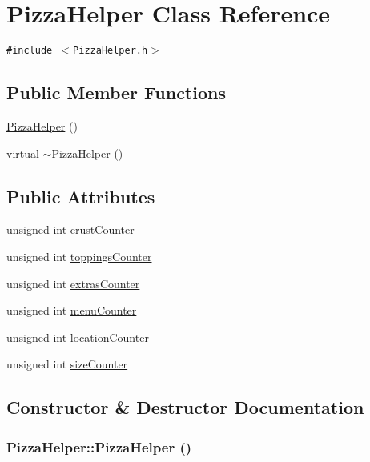 \hypertarget{class_pizza_helper}{
\section{Pizza\-Helper Class Reference}
\label{class_pizza_helper}
}
{\tt \#include $<$Pizza\-Helper.h$>$}

\subsection*{Public Member Functions}
\begin{CompactItemize}
\item 
\hyperlink{class_pizza_helper_f8c1063643d23dc1f6064c670687265e}{Pizza\-Helper} ()
\item 
virtual \hyperlink{class_pizza_helper_e599eb445411bfb68dc12389354c1730}{$\sim$Pizza\-Helper} ()
\end{CompactItemize}
\subsection*{Public Attributes}
\begin{CompactItemize}
\item 
unsigned int \hyperlink{class_pizza_helper_52b9d4656b374668f8dac25cdbdfd1e0}{crust\-Counter}
\item 
unsigned int \hyperlink{class_pizza_helper_450c3826ea82a6622f93e6bdcc939268}{toppings\-Counter}
\item 
unsigned int \hyperlink{class_pizza_helper_34a07585521538b7d236fcce04fb998e}{extras\-Counter}
\item 
unsigned int \hyperlink{class_pizza_helper_e91a67288d9c8eaaa93feeebcfbd1d10}{menu\-Counter}
\item 
unsigned int \hyperlink{class_pizza_helper_225c04650660e2540bff4522e1c13627}{location\-Counter}
\item 
unsigned int \hyperlink{class_pizza_helper_00e1b751a8e3e1d3b531bbbcd4e40948}{size\-Counter}
\end{CompactItemize}


\subsection{Constructor \& Destructor Documentation}
\hypertarget{class_pizza_helper_f8c1063643d23dc1f6064c670687265e}{
\subsubsection[PizzaHelper]{\setlength{\rightskip}{0pt plus 5cm}Pizza\-Helper::Pizza\-Helper ()}}
\label{class_pizza_helper_f8c1063643d23dc1f6064c670687265e}


